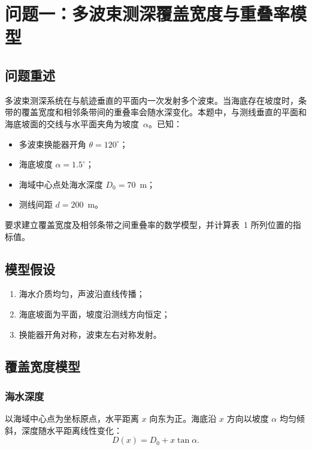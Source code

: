 \documentclass[12pt,a4paper]{ctexart}
\begin{document}
 
 \section{问题一：多波束测深覆盖宽度与重叠率模型}
 
 \subsection{问题重述}
 
 多波束测深系统在与航迹垂直的平面内一次发射多个波束。当海底存在坡度时，条带的覆盖宽度和相邻条带间的重叠率会随水深变化。本题中，与测线垂直的平面和海底坡面的交线与水平面夹角为坡度~$\alpha$。已知：
 \begin{itemize}
     \item 多波束换能器开角 $\theta = 120^\circ$；
     \item 海底坡度 $\alpha = 1.5^\circ$；
     \item 海域中心点处海水深度 $D_0 = 70$~m；
     \item 测线间距 $d = 200$~m。
 \end{itemize}
 要求建立覆盖宽度及相邻条带之间重叠率的数学模型，并计算表~1 所列位置的指标值。
 
 \subsection{模型假设}
 \begin{enumerate}
     \item 海水介质均匀，声波沿直线传播；
     \item 海底坡面为平面，坡度沿测线方向恒定；
     \item 换能器开角对称，波束左右对称发射。
 \end{enumerate}
 
 \subsection{覆盖宽度模型}
 
 \subsubsection{海水深度}
 
 以海域中心点为坐标原点，水平距离 $x$ 向东为正。海底沿 $x$ 方向以坡度 $\alpha$ 均匀倾斜，深度随水平距离线性变化：
 \begin{equation}\label{eq:depth}
     D(x) = D_0 + x \tan\alpha.
 \end{equation}
 
\end{document}
